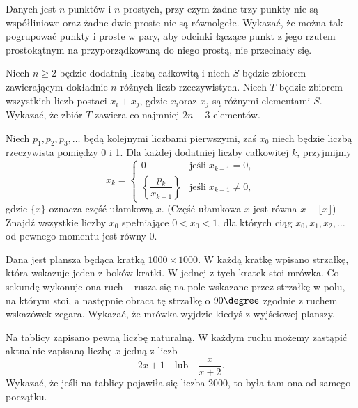 \begin{problem}{1}
	Danych jest $n$ punktów i $n$ prostych, przy czym żadne trzy punkty nie są współliniowe oraz żadne dwie proste nie są równolgełe. Wykazać, że można tak pogrupować punkty i proste w pary, aby odcinki łączące punkt z jego rzutem prostokątnym na przyporządkowaną do niego prostą, nie przecinały się.
\end{problem}

\begin{problem}{2}
	Niech $n \geqslant 2$ będzie dodatnią liczbą całkowitą i niech $S$ będzie zbiorem zawierającym dokładnie $n$ różnych liczb rzeczywistych. Niech $T$ będzie zbiorem wszystkich liczb postaci $x_i + x_j$, gdzie $x_i$oraz $x_j$ są różnymi elementami $S$. Wykazać, że zbiór $T$ zawiera co najmniej $2n - 3$ elementów.
\end{problem}

\begin{problem}{3}
	Niech $p_1, p_2, p_3, \ldots$ będą kolejnymi liczbami pierwszymi, zaś $x_0$ niech będzie liczbą rzeczywista pomiędzy 0 i 1. Dla każdej dodatniej liczby całkowitej $k$, przyjmijmy
\[
	x_k = \begin{cases} 
	0 & \text{jeśli} \; x_{k-1} = 0, \\
	\left\{ \dfrac{p_k}{x_{k-1}} \right\} & \text{jeśli} \; x_{k-1} \neq 0, 
	\end{cases}  
\]
gdzie $\{x\}$ oznacza część ułamkową $x$. (Część ułamkowa $x$ jest równa $x - \lfloor x \rfloor$) Znajdź wszystkie liczby $x_0$ spełniające $0 < x_0 < 1$, dla których ciąg $x_0, x_1, x_2, \ldots$ od pewnego momentu jest równy 0.
\end{problem}

\begin{problem}{4}
	Dana jest plansza będąca kratką $1000\times 1000$. W każdą kratkę wpisano strzałkę, która wskazuje jeden z boków kratki. W jednej z tych kratek stoi mrówka. Co sekundę wykonuje ona ruch -- rusza się na pole wskazane przez strzałkę w polu, na którym stoi, a następnie obraca tę strzałkę o $90\degree$ zgodnie z ruchem wskazówek zegara. Wykazać, że mrówka wyjdzie kiedyś z wyjściowej planszy.
\end{problem}

\begin{problem}{5}
Na tablicy zapisano pewną liczbę naturalną. W każdym ruchu możemy zastąpić aktualnie zapisaną liczbę $x$ jedną z liczb 
\[
    2x + 1 \quad  \text{lub} \quad \dfrac{x}{x + 2}.
\]
Wykazać, że jeśli na tablicy pojawiła się liczba 2000, to była tam ona od samego początku.
\end{problem}


